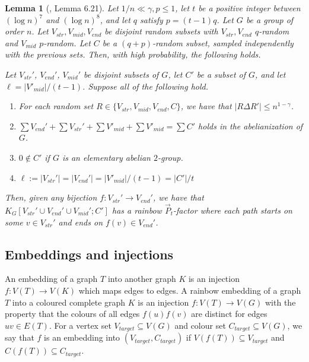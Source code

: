 \documentclass[a4paper,11pt,hidelinks]{amsart}
\newtheorem{lemma}[theorem]{Lemma}
\theoremstyle{definition}
\newcommand{\id}{{0}}%
\begin{document}
\begin{lemma}[\cite{muyesser2022random}, Lemma 6.21]\label{lem:pathlikemain}
    Let $1/n\ll \gamma, p\leq 1$, let $t$ be a positive integer between $(\log n)^7$ and $(\log n)^8$, and let $q$ satisfy  $p=(t-1)q$. Let $G$ be a group of order $n$. Let $V_{str}, V_{mid}, V_{end}$ be disjoint random subsets with $V_{str}, V_{end}$ $q$-random and $V_{mid}$ $p$-random. Let $C$ be a $(q+p)$-random subset, sampled independently with the previous sets. Then, with high probability, the following holds. 
    \par Let $V_{str}'$, $V_{end}'$, $V_{mid}'$ be disjoint subsets of $G$, let $C'$ be a subset of $G$, and let $\ell=|V'_{mid}|/(t-1)$. Suppose all of the following hold.
    \begin{enumerate}
        \item For each random set $R\in\{V_{str}, V_{mid}, V_{end}, C\}$, we have that $|R\Delta R'|\leq n^{1-\gamma}$.
        \item $\sum V_{end}'+\sum V_{str}'+ \sum V'_{mid}+ \sum V'_{mid}=\sum C'$ holds in the abelianization of $G$.
        \item $\id \notin C'$ if $G$ is an elementary abelian $2$-group.
        \item $\ell:=|V_{str}'|=|V_{end}'|=|V'_{mid}|/(t-1)=|C'|/t$
    \end{enumerate}
    Then, given any bijection $f\colon V_{str}'\to V_{end}'$, we have that $K_G[V_{str}'\cup V_{end}'\cup V_{mid}';C']$ has a rainbow $\vec{P}_t$-factor where each path starts on some $v\in V_{str}'$ and ends on $f(v)\in V_{end}'$.
\end{lemma}

\subsection{Embeddings and injections}
An embedding of a graph $T$ into another graph $K$ is an injection $f:V(T)\to V(K)$ which maps edges to edges. %
A rainbow embedding of a graph $T$ into a coloured complete graph $K$ is an injection $f:V(T)\to V(G)$ with the property that the colours of all edges $f(u)f(v)$ are distinct for edges $uv\in E(T)$. For a vertex set $V_{target}\subseteq V(G)$ and colour set $C_{target}\subseteq V(G)$, we say that $f$ is an embedding into $(V_{target}, C_{target})$ if $V(f(T))\subseteq V_{target}$ and $C(f(T))\subseteq C_{target}$.
\end{document}

